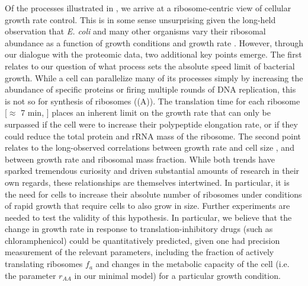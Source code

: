 Of the processes illustrated in , we arrive at a
ribosome-centric view of cellular growth rate control. This is in some sense
unsurprising given the long-held observation that \textit{E. coli} and many
other organisms vary their ribosomal abundance as a function of growth
conditions and growth rate \citep{scott2010, metzlraz2017}. However, through our
dialogue with the proteomic data, two additional key points emerge. The first
relates to our question of what process sets the absolute speed limit of
bacterial growth. While a cell can parallelize many of its processes simply by
increasing the abundance of specific proteins or firing multiple rounds of DNA
replication, this is not so for synthesis of ribosomes
((A)). The translation time for each ribosome [$\approx$ 7
min, \cite{dill2011}] places an inherent limit on the growth rate that can only
be surpassed if the cell were to increase their polypeptide elongation rate, or
if they could reduce the total protein and rRNA mass of the ribosome. The second
point relates to the long-observed correlations between growth rate and cell
size \citep{schaechter1958, si2017}, and between growth rate and ribosomal mass
fraction. While both trends have sparked tremendous curiosity and driven
substantial amounts of research in their own regards, these relationships are
themselves intertwined. In particular, it is the need for cells to increase
their absolute number of ribosomes under conditions of rapid growth that require
cells to also grow in size. Further experiments are needed to test the validity
of this hypothesis. In particular, we believe that the change in growth rate in
response to translation-inhibitory drugs (such as chloramphenicol) could be
quantitatively predicted, given one had precision measurement of the relevant
parameters, including the fraction of actively translating ribosomes $f_a$ and
changes in the metabolic capacity of the cell (i.e. the parameter $r_{AA}$ in
our minimal model) for a particular growth condition.


